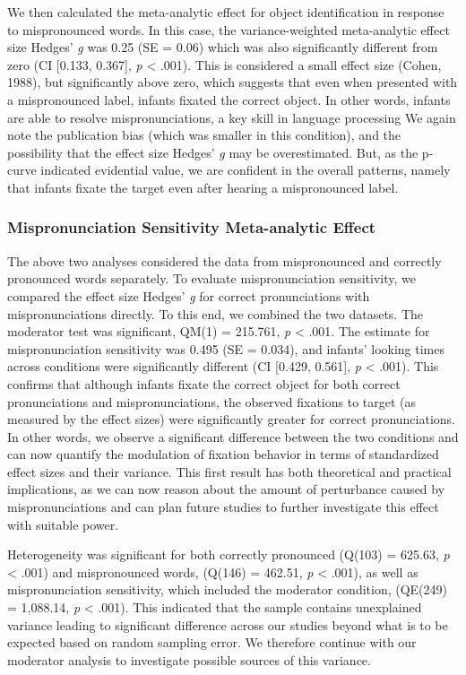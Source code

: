 \documentclass[man]{apa6}
\theoremstyle{definition}
\theoremstyle{definition}
\theoremstyle{definition}
\theoremstyle{remark}
\begin{document}
We then calculated the meta-analytic effect for object identification in
response to mispronounced words. In this case, the variance-weighted
meta-analytic effect size Hedges' \emph{g} was 0.25 (SE = 0.06) which
was also significantly different from zero (CI {[}0.133, 0.367{]},
\emph{p} \textless{} .001). This is considered a small effect size
(Cohen, 1988), but significantly above zero, which suggests that even
when presented with a mispronounced label, infants fixated the correct
object. In other words, infants are able to resolve mispronunciations, a
key skill in language processing We again note the publication bias
(which was smaller in this condition), and the possibility that the
effect size Hedges' \emph{g} may be overestimated. But, as the p-curve
indicated evidential value, we are confident in the overall patterns,
namely that infants fixate the target even after hearing a mispronounced
label.

\subsubsection{Mispronunciation Sensitivity Meta-analytic
Effect}\label{mispronunciation-sensitivity-meta-analytic-effect}

The above two analyses considered the data from mispronounced and
correctly pronounced words separately. To evaluate mispronunciation
sensitivity, we compared the effect size Hedges' \emph{g} for correct
pronunciations with mispronunciations directly. To this end, we combined
the two datasets. The moderator test was significant, QM(1) = 215.761,
\emph{p} \textless{} .001. The estimate for mispronunciation sensitivity
was 0.495 (SE = 0.034), and infants' looking times across conditions
were significantly different (CI {[}0.429, 0.561{]}, \emph{p}
\textless{} .001). This confirms that although infants fixate the
correct object for both correct pronunciations and mispronunciations,
the observed fixations to target (as measured by the effect sizes) were
significantly greater for correct pronunciations. In other words, we
observe a significant difference between the two conditions and can now
quantify the modulation of fixation behavior in terms of standardized
effect sizes and their variance. This first result has both theoretical
and practical implications, as we can now reason about the amount of
perturbance caused by mispronunciations and can plan future studies to
further investigate this effect with suitable power.

Heterogeneity was significant for both correctly pronounced (Q(103) =
625.63, \emph{p} \textless{} .001) and mispronounced words, (Q(146) =
462.51, \emph{p} \textless{} .001), as well as mispronunciation
sensitivity, which included the moderator condition, (QE(249) =
1,088.14, \emph{p} \textless{} .001). This indicated that the sample
contains unexplained variance leading to significant difference across
our studies beyond what is to be expected based on random sampling
error. We therefore continue with our moderator analysis to investigate
possible sources of this variance.
\end{document}

